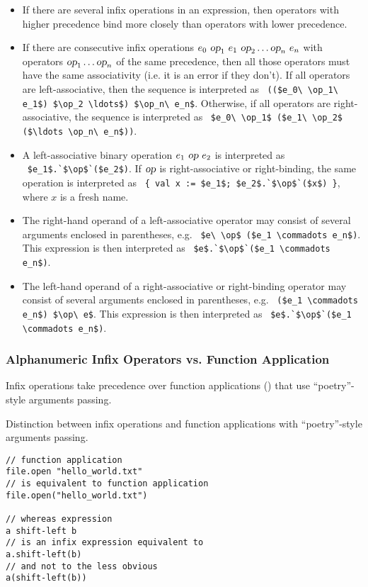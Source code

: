 \begin{itemize}
\item If there are several infix operations in an expression, then operators with higher precedence bind more closely than operators with lower precedence. 

\item If there are consecutive infix operations $e_0\ \mbox{\sl op}_1\ e_1\ \mbox{\sl op}_2 \ldots \mbox{\sl op}_n\ e_n$ with operators $\mbox{\sl op}_1 \ldots \mbox{\sl op}_n$ of the same precedence, then all those operators must have the same associativity (i.e. it is an error if they don't). If all operators are left-associative, then the sequence is interpreted as ~\lstinline!(($e_0\ \op_1\ e_1$) $\op_2 \ldots$) $\op_n\ e_n$!. Otherwise, if all operators are right-associative, the sequence is interpreted as ~\lstinline!$e_0\ \op_1$ ($e_1\ \op_2$ ($\ldots \op_n\ e_n$))!.

\item A left-associative binary operation $e_1\ \mbox{\sl op}\ e_2$ is interpreted as ~\lstinline!$e_1$.`$\op$`($e_2$)!. If $\mbox{\sl op}$ is right-associative or right-binding, the same operation is interpreted as ~\lstinline!{ val x := $e_1$; $e_2$.`$\op$`($x$) }!, where $x$ is a fresh name. 

\item The right-hand operand of a left-associative operator may consist of several arguments enclosed in parentheses, e.g. ~\lstinline!$e\ \op$ ($e_1 \commadots e_n$)!. This expression is then interpreted as ~\lstinline!$e$.`$\op$`($e_1 \commadots e_n$)!. 

\item The left-hand operand of a right-associative or right-binding operator may consist of several arguments enclosed in parentheses, e.g. ~\lstinline!($e_1 \commadots e_n$) $\op\ e$!. This expression is then interpreted as ~\lstinline!$e$.`$\op$`($e_1 \commadots e_n$)!. 
\end{itemize}





\subsubsection{Alphanumeric Infix Operators vs. Function Application}

Infix operations take precedence over function applications () that use ``poetry''-style arguments passing.

\example Distinction between infix operations and function applications with ``poetry''-style arguments passing. 
\begin{lstlisting}
// function application
file.open "hello_world.txt"
// is equivalent to function application
file.open("hello_world.txt")

// whereas expression
a shift-left b
// is an infix expression equivalent to
a.shift-left(b)
// and not to the less obvious
a(shift-left(b))
\end{lstlisting}

